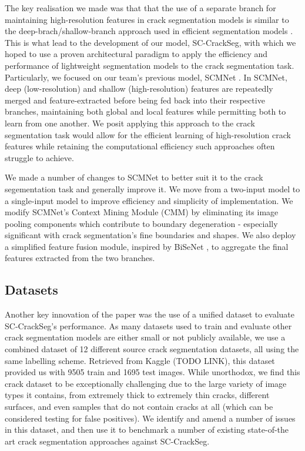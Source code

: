 \documentclass[a4paper,12pt]{report}
\begin{document}
The key realisation we made was that that the use of a separate branch for maintaining high-resolution features in crack segmentation models \cite{nayyeri_multi-resolution_2021} is similar to the deep-brach/shallow-branch approach used in efficient segmentation models \cite{yu_bisenet_2018} \cite{poudel_contextnet_2018}. This is what lead to the development of our model, SC-CrackSeg, with which we hoped to use a proven architectural paradigm to apply the efficiency and performance of lightweight segmentation models to the crack segmentation task. Particularly, we focused on our team's previous model, SCMNet \cite{singha_scmnet_2021}. In SCMNet, deep (low-resolution) and shallow (high-resolution) features are repeatedly merged and feature-extracted before being fed back into their respective branches, maintaining both global and local features while permitting both to learn from one another. We posit applying this approach to the crack segmentation task would allow for the efficient learning of high-resolution crack features while retaining the computational efficiency such approaches often struggle to achieve.

We made a number of changes to SCMNet to better suit it to the crack segementation task and generally improve it. We move from a two-input model to a single-input model to improve efficiency and simplicity of implementation. We modify SCMNet's Context Mining Module (CMM) by eliminating its image pooling components which contribute to boundary degeneration - especially significant with crack segmentation's fine boundaries and shapes. We also deploy a simplified feature fusion module, inspired by BiSeNet \cite{yu_bisenet_2018}, to aggregate the final features extracted from the two branches. %

\subsection{Datasets}
Another key innovation of the paper was the use of a unified dataset to evaluate SC-CrackSeg's performance. As many datasets used to train and evaluate other crack segmentation models are either small or not publicly available, we use a combined dataset of 12 different source crack segmentation datasets, all using the same labelling scheme. Retrieved from Kaggle (TODO LINK), this dataset provided us with 9505 train and 1695 test images. While unorthodox, we find this crack dataset to be exceptionally challenging due to the large variety of image types it contains, from extremely thick to extremely thin cracks, different surfaces, and even samples that do not contain cracks at all (which can be considered testing for false positives). We identify and amend a number of issues in this dataset, and then use it to benchmark a number of existing state-of-the art crack segmentation approaches against SC-CrackSeg.
\end{document}
